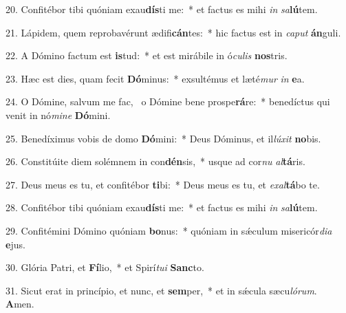 20. Confitébor tibi quóniam exau\textbf{dís}ti me:~*  et factus es mihi \textit{in} \textit{sa}\textbf{lú}tem.\

21. Lápidem, quem reprobavérunt ædifi\textbf{cán}tes:~*  hic factus est in \textit{ca}\textit{put} \textbf{án}guli.\

22. A Dómino factum est \textbf{is}tud:~*  et est mirábile in ó\textit{cu}\textit{lis} \textbf{nos}tris.\

23. Hæc est dies, quam fecit \textbf{Dó}minus:~*  exsultémus et læté\textit{mur} \textit{in} \textbf{e}a.\

24. O Dómine, salvum me fac, \dag\  o Dómine bene prospe\textbf{rá}re:~*  benedíctus qui venit in nó\textit{mi}\textit{ne} \textbf{Dó}mini.\

25. Benedíximus vobis de domo \textbf{Dó}mini:~*  Deus Dóminus, et il\textit{lú}\textit{xit} \textbf{no}bis.\

26. Constitúite diem solémnem in con\textbf{dén}sis,~*  usque ad cor\textit{nu} \textit{al}\textbf{tá}ris.\

27. Deus meus es tu, et confitébor \textbf{ti}bi:~*  Deus meus es tu, et \textit{ex}\textit{al}\textbf{tá}bo te.\

28. Confitébor tibi quóniam exau\textbf{dís}ti me:~*  et factus es mihi \textit{in} \textit{sa}\textbf{lú}tem.\

29. Confitémini Dómino quóniam \textbf{bo}nus:~*  quóniam in sǽculum misericór\textit{di}\textit{a} \textbf{e}jus.\

30. Glória Patri, et \textbf{Fí}lio,~*  et Spirí\textit{tu}\textit{i} \textbf{Sanc}to.\

31. Sicut erat in princípio, et nunc, et \textbf{sem}per,~*  et in sǽcula sæcu\textit{ló}\textit{rum}. \textbf{A}men.\

